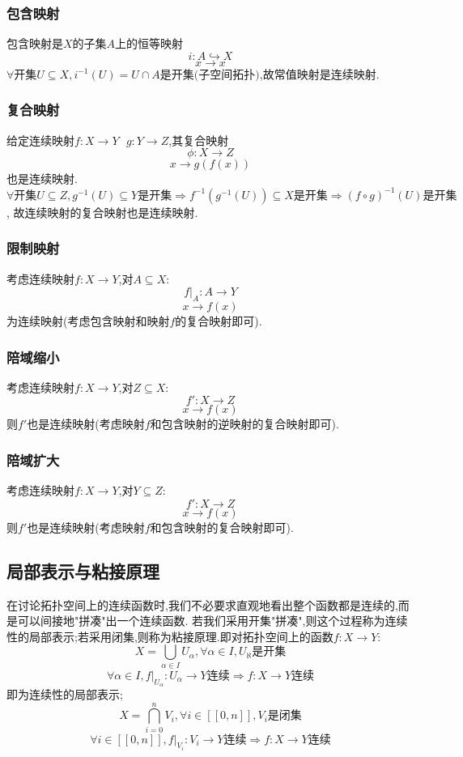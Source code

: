 \documentclass[12pt, a4paper, oneside]{ctexbook}
\newcommand{\continue }{\text{连续}}%
\begin{document}
  \subsubsection{包含映射 }
  包含映射是$X$的子集$A$上的恒等映射
  $$
    i:A\hookrightarrow  X
  $$
  $$
    x\rightarrow x
  $$
  $\forall \text{开集}U\subseteq X,i^{-1}(U)=U\cap A \text{是开集(子空间拓扑)}$,故常值映射是连续映射.
  \subsubsection{复合映射 }
  给定连续映射$f:X\rightarrow  Y\text{    }g:Y\rightarrow  Z$,其复合映射
  $$
    \phi:X\rightarrow Z
  $$
  $$
    x\rightarrow g(f(x))
  $$
  也是连续映射.$\forall \text{开集}U\subseteq Z,g^{-1}(U)\subseteq Y 
  \text{是开集}\Rightarrow f^{-1}(g^{-1}(U))\subseteq X\text{是开集}\Rightarrow (f\circ g)^{-1}(U)\text{是开集}$,
  故连续映射的复合映射也是连续映射.
  \subsubsection{限制映射 }
  考虑连续映射$f:X\rightarrow Y$,对$A\subseteq X:$
  $$
  f|_A:A\rightarrow Y
  $$
  $$
    x\rightarrow f(x)
  $$
  为连续映射(考虑包含映射和映射$f$的复合映射即可).
  \subsubsection{陪域缩小}
  考虑连续映射$f:X\rightarrow Y$,对$Z\subseteq X:$
  $$
    f': X\rightarrow Z
  $$
  $$
    x\rightarrow f(x)
  $$
  则$f'$也是连续映射(考虑映射$f$和包含映射的逆映射的复合映射即可).
  \subsubsection{陪域扩大}
  考虑连续映射$f:X\rightarrow Y$,对$Y\subseteq Z:$
  $$
    f': X\rightarrow Z
  $$
  $$
    x\rightarrow f(x)
  $$
  则$f'$也是连续映射(考虑映射$f$和包含映射的复合映射即可).
  \subsection{局部表示与粘接原理 }
  在讨论拓扑空间上的连续函数时,我们不必要求直观地看出整个函数都是连续的,而是可以间接地"拼凑"出一个连续函数.
  若我们采用开集"拼凑",则这个过程称为连续性的局部表示;若采用闭集,则称为粘接原理.即对拓扑空间上的函数$f:X\rightarrow Y$:
  $$
    X=\bigcup_{\alpha\in I}U_\alpha ,\forall \alpha\in I, U_\aleph\text{是开集}
  $$
  $$
  \forall \alpha\in I,f|_{U_\alpha}:U_\alpha\rightarrow Y\continue\Rightarrow f:X\rightarrow Y\continue
  $$
  即为连续性的局部表示;
  $$
    X=\bigcap_{i=0}^{n}V_i ,\forall i\in[\![0,n]\!], V_i\text{是闭集}
  $$
  $$
    \forall i\in[\![0,n]\!],f|_{V_i}:V_i\rightarrow Y\continue\Rightarrow f:X\rightarrow Y\continue
  $$
\end{document}
